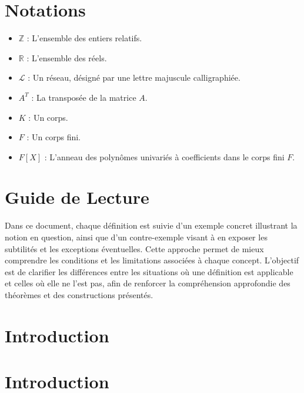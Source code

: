 \documentclass[a4paper,12pt]{report}  %
\theoremstyle{definitionstyle}
\theoremstyle{examplestyle}
\theoremstyle{remarkstyle}
\theoremstyle{propositionstyle}
\begin{document}
	
	\tableofcontents
	
	\chapter*{Notations}
	
	\begin{itemize}
		\item $\mathbb{Z}$ : L'ensemble des entiers relatifs.
		\item $\mathbb{R}$ : L'ensemble des réels.
		\item $\mathcal{L}$ : Un réseau, désigné par une lettre majuscule calligraphiée.
		\item $A^T$ : La transposée de la matrice $A$.
		\item $K$ : Un corps.
		\item $F$ : Un corps fini.
		\item $F[X]$ : L'anneau des polynômes univariés à coefficients dans le corps fini $F$.
	\end{itemize}
	
	
	\chapter*{Guide de Lecture}
	
	Dans ce document, chaque définition est suivie d'un exemple concret illustrant la notion en question, ainsi que d'un contre-exemple visant à en exposer les subtilités et les exceptions éventuelles. Cette approche permet de mieux comprendre les conditions et les limitations associées à chaque concept. L'objectif est de clarifier les différences entre les situations où une définition est applicable et celles où elle ne l'est pas, afin de renforcer la compréhension approfondie des théorèmes et des constructions présentés.
	
	
	
	
	
	\chapter*{Introduction}
	
	\chapter*{Introduction}
	
\end{document}

